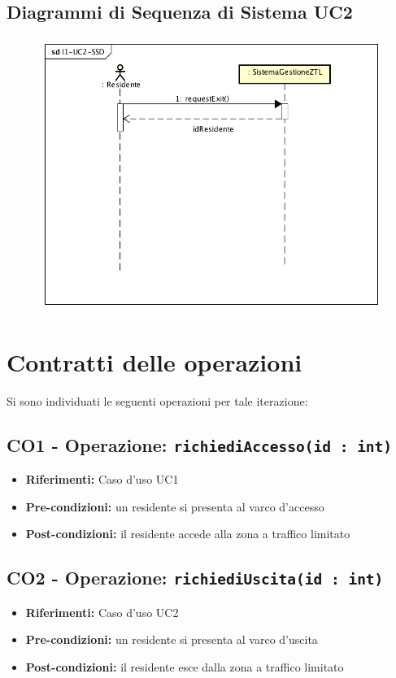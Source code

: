 \documentclass[12pt, letterpaper]{article}
\begin{document}
\subsection{Diagrammi di Sequenza di Sistema UC2}
\begin{figure}[H]
    \centering
    \includegraphics[scale=0.50]{I1-UC2-SSD}
    \label{fig:mesh1}
\end{figure}

\section{Contratti delle operazioni}
Si sono individuati le seguenti operazioni 
per tale iterazione:
\subsection{CO1 - Operazione: \texttt{richiediAccesso(id : int)}}
\begin{itemize}
    \item \textbf{Riferimenti:} Caso d'uso UC1
    \item \textbf{Pre-condizioni:} un residente si
    presenta al varco d'accesso
    \item \textbf{Post-condizioni:} il residente 
    accede alla zona a traffico limitato
\end{itemize}

\subsection{CO2 - Operazione: \texttt{richiediUscita(id : int)}}
\begin{itemize}
    \item \textbf{Riferimenti:} Caso d'uso UC2
    \item \textbf{Pre-condizioni:} un residente si
    presenta al varco d'uscita
    \item \textbf{Post-condizioni:} il residente 
    esce dalla zona a traffico limitato
\end{itemize}
\end{document}
